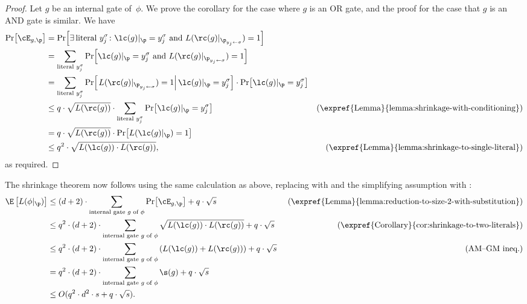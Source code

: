 \begin{proof}
Let $g$ be an internal gate of~$\phi$. We prove the corollary for
the case where $g$ is an OR gate, and the proof for the case that
$g$ is an AND gate is similar. We have 
\begin{align*}
\Pr\!\left[\cE_{g,\p}\right] & =\Pr\!\left[\exists\,\text{literal }y_{j}^{\sigma}\colon\lc(g)|_{\p}=y_{j}^{\sigma}\text{ and }L(\rc(g)|_{\p_{y_{j}\gets\sigma}})=1\right]\\
 & =\sum_{\text{literal }y_{j}^{\sigma}}\Pr\!\left[\lc(g)|_{\p}=y_{j}^{\sigma}\text{ and }L(\rc(g)|_{\p_{y_{j}\gets\sigma}})=1\right]\\
 & =\sum_{\text{literal }y_{j}^{\sigma}}\Pr\!\left[\left.L(\rc(g)|_{\p_{y_{j}\gets\sigma}})=1\right|\lc(g)|_{\p}=y_{j}^{\sigma}\right]\cdot\Pr\!\left[\lc(g)|_{\p}=y_{j}^{\sigma}\right]\\
 & \le q\cdot\sqrt{L(\rc(g))}\cdot\sum_{\text{literal }y_{j}^{\sigma}}\Pr\!\left[\lc(g)|_{\p}=y_{j}^{\sigma}\right] & \text{(\expref{Lemma}{lemma:shrinkage-with-conditioning})}\\
 & =q\cdot\sqrt{L(\rc(g))}\cdot\Pr\!\left[L(\lc(g)|_{\p})=1\right]\\
 & \le q^{2}\cdot\sqrt{L(\lc(g))\cdot L(\rc(g))}, & \text{(\expref{Lemma}{lemma:shrinkage-to-single-literal})}
\end{align*}
as required. 
\end{proof}
The shrinkage theorem now follows using the same calculation as above,
replacing  with 
and the simplifying assumption with :
\begin{align*}
\E\left[L(\phi|_{\p})\right] & \le(d+2)\cdot\sum_{\text{internal gate \ensuremath{g} of \ensuremath{\phi}}}\Pr\!\left[\cE_{g,\p}\right]+q\cdot\sqrt{s} & \ \text{(\expref{Lemma}{lemma:reduction-to-size-2-with-substitution})}\\
 & \le q^{2}\cdot(d+2)\cdot\sum_{\text{internal gate \ensuremath{g} of \ensuremath{\phi}}}\sqrt{L(\lc(g))\cdot L(\rc(g))}+q\cdot\sqrt{s} & \ \text{(\expref{Corollary}{cor:shrinkage-to-two-literals})}\\
& \le q^{2}\cdot(d+2)\cdot\sum_{\text{internal gate \ensuremath{g} of \ensuremath{\phi}}}\left(L(\lc(g))+L(\rc(g))\right)+q\cdot\sqrt{s} &
%
\ \text{(AM--GM ineq.)}\\   %
 & =q^{2}\cdot(d+2)\cdot\sum_{\text{internal gate \ensuremath{g} of \ensuremath{\phi}}}\s(g)+q\cdot\sqrt{s}\\
 & \le O(q^{2}\cdot d^{2}\cdot s+q\cdot\sqrt{s}).
\end{align*}

